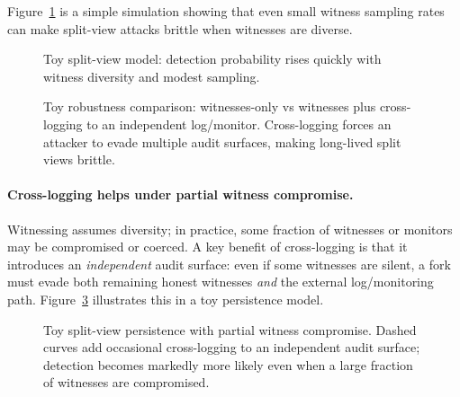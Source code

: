 \documentclass[11pt]{article}
\begin{document}
Figure~\ref{fig:split_view} is a simple simulation showing that even small witness sampling rates can make split-view attacks brittle when witnesses are diverse.

\begin{figure}[t]
\centering
{}
\caption{Toy split-view model: detection probability rises quickly with witness diversity and modest sampling.}
\label{fig:split_view}
\end{figure}

\begin{figure}[t]
\centering
{}
\caption{Toy robustness comparison: witnesses-only vs witnesses plus cross-logging to an independent log/monitor.
Cross-logging forces an attacker to evade multiple audit surfaces, making long-lived split views brittle.}
\label{fig:crosslog}
\end{figure}


\paragraph{Cross-logging helps under partial witness compromise.}
Witnessing assumes diversity; in practice, some fraction of witnesses or monitors may be compromised or coerced.
A key benefit of cross-logging is that it introduces an \emph{independent} audit surface: even if some witnesses are silent,
a fork must evade both remaining honest witnesses \emph{and} the external log/monitoring path.
Figure~\ref{fig:crosslog_comp} illustrates this in a toy persistence model.

\begin{figure}[t]
\centering
{}
\caption{Toy split-view persistence with partial witness compromise.
Dashed curves add occasional cross-logging to an independent audit surface; detection becomes markedly more likely even when a large fraction of witnesses are compromised.}
\label{fig:crosslog_comp}

\end{figure}
\end{document}
